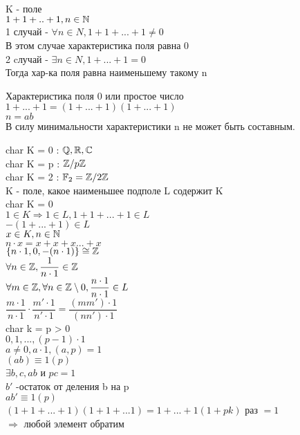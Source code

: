 K - поле \\
$ 1+1+..+1, n \in \mathbb{N}$ \\
1 случай - $ \forall n \in N, 1+1+...+1 \neq 0 $ \\
В этом случае характеристика поля равна 0 \\
2 cлучай - $ \exists n \in N, 1+...+1 = 0 $ \\
Тогда хар-ка поля равна наименьшему такому n\\
\begin{lemma}
	Характеристика поля 0 или простое число \\
	$ 1+...+1 = (1+...+1)(1+...+1) $ \\
	$ n = ab $ \\
	В силу минимальности характеристики n не может быть составным.
\end{lemma}
char K = 0 : $ \mathbb{Q}, \mathbb{R}, \mathbb{C} $ \\
char K = p : $ \mathbb{Z} / p\mathbb{Z} $ \\
char K = 2 : $ \mathbb{F}_2 = \mathbb{Z} /2\mathbb{Z} $ \\
K - поле, какое наименьшее подполе L содержит K \\
char K = 0 \\
$ 1 \in K \Rightarrow 1 \in L, 1+1+...+1 \in L $ \\
$ - (1+...+1) \in L $ \\
$ x \in K, n \in \mathbb{N} $ \\
$ n \cdot x = x+x+x...+x $ \\
$ \{ n\cdot 1, 0, -(n \cdot 1) \} \cong \mathbb{Z}  $ \\
$ \forall n \in \mathbb{Z}, \dfrac{1}{n\cdot 1} \in \mathbb{Z} $ \\
$ \forall m \in \mathbb{Z}, \forall n \in \mathbb{Z} \setminus 0, \dfrac{n\cdot 1}{n\cdot 1} \in L $ \\
$ \dfrac{m\cdot 1}{n \cdot 1} \cdot \dfrac{m'\cdot 1}{n'\cdot 1} = \dfrac{(mm') \cdot 1}{(nn')\cdot 1} $ \\
char k = p > 0 \\
$ 0, 1, ..., (p-1)\cdot 1 $ \\
$ a \neq 0, a \cdot 1, (a,p) = 1 $ \\
$ (ab) \equiv 1 (p)$ \\
$ \exists b,c, ab $ и $ pc  = 1$ \\
$ b' $  -остаток от деления b на p \\
$ ab' \equiv 1(p) $ \\
$ (1+1+...+1)(1+1+...1)  =1+...+1 (1+pk) $ раз $ = 1 $ \\
$ \Rightarrow $ любой элемент обратим \\
